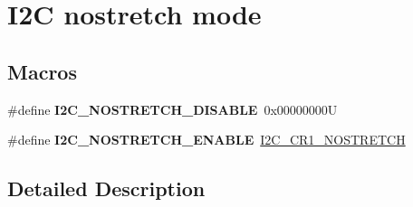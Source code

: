 \hypertarget{group___i2_c__nostretch__mode}{}\section{I2C nostretch mode}
\label{group___i2_c__nostretch__mode}
\subsection*{Macros}
\begin{DoxyCompactItemize}
\item 
\mbox{\label{group___i2_c__nostretch__mode_ga611deefe89e56fa65f853e6796f2cf66}} 
\#define {\bfseries I2\+C\+\_\+\+N\+O\+S\+T\+R\+E\+T\+C\+H\+\_\+\+D\+I\+S\+A\+B\+LE}~0x00000000U
\item 
\mbox{\label{group___i2_c__nostretch__mode_ga67ebace1182d99bb5d7968994c01c80e}} 
\#define {\bfseries I2\+C\+\_\+\+N\+O\+S\+T\+R\+E\+T\+C\+H\+\_\+\+E\+N\+A\+B\+LE}~\mbox{\hyperlink{group___peripheral___registers___bits___definition_ga197aaca79f64e832af3a0a0864c2a08c}{I2\+C\+\_\+\+C\+R1\+\_\+\+N\+O\+S\+T\+R\+E\+T\+CH}}
\end{DoxyCompactItemize}


\subsection{Detailed Description}
